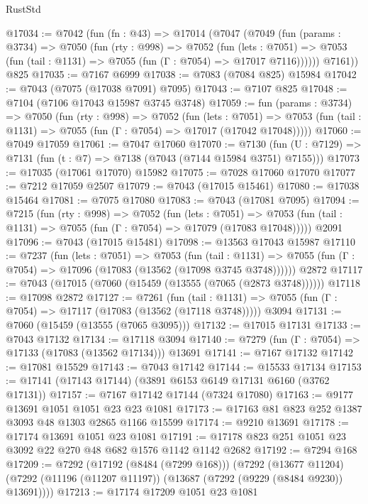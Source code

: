 \begin{lexlean}{RustStd}
\begin{coremodule}
@17034 := @7042
    (fun (fn : @43) =>
    @17014
      (@7047
        (@7049
          (fun (params : @3734) =>
          @7050
            (fun (rty : @998) =>
            @7052
              (fun (lets : @7051) =>
              @7053 (fun (tail : @1131) => @7055 (fun (Γ : @7054) => @17017 @7116))))))
        @7161))
    @825
@17035 := @7167 @6999
@17038 := @7083 (@7084 @825) @15984
@17042 := @7043 (@7075 (@17038 @7091) @7095)
@17043 := @7107 @825
@17048 := @7104 (@7106 @17043 @15987 @3745 @3748)
@17059 := fun (params : @3734) =>
  @7050
    (fun (rty : @998) =>
    @7052
      (fun (lets : @7051) =>
      @7053 (fun (tail : @1131) => @7055 (fun (Γ : @7054) => @17017 (@17042 @17048)))))
@17060 := @7049 @17059
@17061 := @7047 @17060
@17070 := @7130
    (fun (U : @7129) => @7131 (fun (t : @7) => @7138 (@7043 (@7144 @15984 @3751) @7155)))
@17073 := @17035 (@17061 @17070) @15982
@17075 := @7028 @17060 @17070
@17077 := @7212 @17059 @2507
@17079 := @7043 (@17015 @15461)
@17080 := @17038 @15464
@17081 := @7075 @17080
@17083 := @7043 (@17081 @7095)
@17094 := @7215
    (fun (rty : @998) =>
    @7052
      (fun (lets : @7051) =>
      @7053 (fun (tail : @1131) => @7055 (fun (Γ : @7054) => @17079 (@17083 @17048)))))
    @2091
@17096 := @7043 (@17015 @15481)
@17098 := @13563 @17043 @15987
@17110 := @7237
    (fun (lets : @7051) =>
    @7053
      (fun (tail : @1131) =>
      @7055 (fun (Γ : @7054) => @17096 (@17083 (@13562 (@17098 @3745 @3748))))))
    @2872
@17117 := @7043 (@17015 (@7060 (@15459 (@13555 (@7065 (@2873 @3748))))))
@17118 := @17098 @2872
@17127 := @7261
    (fun (tail : @1131) => @7055 (fun (Γ : @7054) => @17117 (@17083 (@13562 (@17118 @3748)))))
    @3094
@17131 := @7060 (@15459 (@13555 (@7065 @3095)))
@17132 := @17015 @17131
@17133 := @7043 @17132
@17134 := @17118 @3094
@17140 := @7279 (fun (Γ : @7054) => @17133 (@17083 (@13562 @17134))) @13691
@17141 := @7167 @17132
@17142 := @17081 @15529
@17143 := @7043 @17142
@17144 := @15533 @17134
@17153 := @17141 (@17143 @17144) (@3891 @6153 @6149 @17131 @6160 (@3762 @17131))
@17157 := @7167 @17142 @17144 (@7324 @17080)
@17163 := @9177 @13691 @1051 @1051 @23 @23 @1081
@17173 := @17163 @81 @823 @252 @1387 @3093 @48 @1303 @2865 @1166 @15599
@17174 := @9210 @13691
@17178 := @17174 @13691 @1051 @23 @1081
@17191 := @17178 @823 @251 @1051 @23 @3092 @22 @270 @48 @682 @1576 @1142 @1142 @2682
@17192 := @7294 @168
@17209 := @7292
    (@17192 (@8484 (@7299 @168)))
    (@7292
      (@13677 @11204)
      (@7292 (@11196 (@11207 @11197)) (@13687 (@7292 (@9229 (@8484 @9230)) @13691))))
@17213 := @17174 @17209 @1051 @23 @1081

\end{coremodule}
\end{lexlean}

